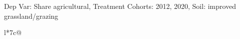 \begin{table}[H]
\captionlistentry[table]{}
\label{table:beaver_land_class_DVis_land_class_1_SCg13_SSIGRG}
\scriptsize %
Dep Var: Share agricultural, Treatment Cohorts: 2012, 2020, Soil: improved grassland/grazing \\
\begin{threeparttable}
\begin{tabulary}{\textwidth}{l*{7}{c}@{}}
\toprule \toprule
\noalign{\smallskip}
\noalign{\smallskip}
\midrule \bottomrule
\end{tabulary}
\medskip
\end{threeparttable}
\end{table}
